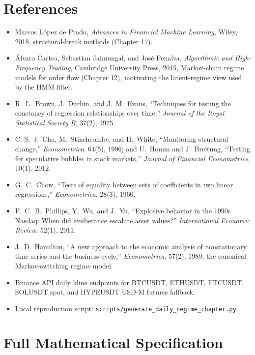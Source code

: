 \documentclass[11pt]{article}
\begin{document}
\section{References}

\begin{itemize}
    \item Marcos L\'opez de Prado, \emph{Advances in Financial Machine Learning}, Wiley, 2018, structural-break methods (Chapter 17).
    \item \'Alvaro Cartea, Sebastian Jaimungal, and Jos\'e Penalva, \emph{Algorithmic and High-Frequency Trading}, Cambridge University Press, 2015, Markov-chain regime models for order flow (Chapter 12), motivating the latent-regime view used by the HMM filter.
    \item R.~L.~Brown, J.~Durbin, and J.~M.~Evans, ``Techniques for testing the constancy of regression relationships over time,'' \emph{Journal of the Royal Statistical Society B}, 37(2), 1975.
    \item C.-S.~J.~Chu, M.~Stinchcombe, and H.~White, ``Monitoring structural change,'' \emph{Econometrica}, 64(5), 1996; and U.~Homm and J.~Breitung, ``Testing for speculative bubbles in stock markets,'' \emph{Journal of Financial Econometrics}, 10(1), 2012.
    \item G.~C.~Chow, ``Tests of equality between sets of coefficients in two linear regressions,'' \emph{Econometrica}, 28(3), 1960.
    \item P.~C.~B.~Phillips, Y.~Wu, and J.~Yu, ``Explosive behavior in the 1990s Nasdaq: When did exuberance escalate asset values?'' \emph{International Economic Review}, 52(1), 2011.
    \item J.~D.~Hamilton, ``A new approach to the economic analysis of nonstationary time series and the business cycle,'' \emph{Econometrica}, 57(2), 1989, the canonical Markov-switching regime model.
    \item Binance API daily kline endpoints for BTCUSDT, ETHUSDT, ETCUSDT, SOLUSDT spot, and HYPEUSDT USD-M futures fallback.
    \item Local reproduction script: \texttt{scripts/generate\_daily\_regime\_chapter.py}.
\end{itemize}

\appendix

\section{Full Mathematical Specification}\label{app:math}
\end{document}
